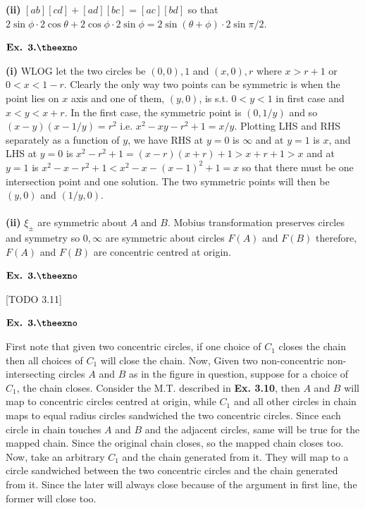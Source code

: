 \documentclass{article}
\def\tf{\textbf}
\newcounter{exno}
\begin{document}
\tf{(ii)} $[ab][cd] + [ad][bc] = [ac][bd]$ so that $2\sin\phi\cdot 2\cos\theta + 2\cos\phi\cdot 2\sin\phi = 2\sin(\theta+\phi)\cdot 2\sin\pi/2$.

\vspace{0.2in}

${\textbf{Ex. 3.\theexno}}$
\addtocounter{exno}{1}

\tf{(i)} WLOG let the two circles be $(0,0),1$ and $(x,0),r$ where $x>r+1$ or $0 < x < 1-r$. Clearly the only way two points can be symmetric is when the point lies on $x$ axis and one of them, $(y,0)$, is s.t. $0 < y < 1$ in first case and $x < y < x+r$. In the first case, the symmetric point is $(0,1/y)$ and so $(x-y)(x-1/y) = r^2$ i.e. $x^2-xy-r^2+1 = x/y$. Plotting LHS and RHS separately as a function of $y$, we have RHS at $y=0$ is $\infty$ and at $y=1$ is $x$, and LHS at $y=0$ is $x^2-r^2+1 = (x-r)(x+r)+1 > x+r+1 > x$ and at $y=1$ is $x^2-x-r^2+1 < x^2-x-(x-1)^2+1 = x$ so that there must be one intersection point and one solution. The two symmetric points will then be $(y,0)$ and $(1/y,0)$.\\~\\

\tf{(ii)} $\xi_{\pm}$ are symmetric about $A$ and $B$. Mobius transformation preserves circles and symmetry so $0,\infty$ are symmetric about circles $F(A)$ and $F(B)$ therefore, $F(A)$ and $F(B)$ are concentric centred at origin.

\vspace{0.2in}

${\textbf{Ex. 3.\theexno}}$
\addtocounter{exno}{1}

[TODO 3.11]

\vspace{0.2in}

${\textbf{Ex. 3.\theexno}}$
\addtocounter{exno}{1}

First note that given two concentric circles, if one choice of $C_1$ closes the chain then all choices of $C_1$ will close the chain. Now, Given two non-concentric non-intersecting circles $A$ and $B$ as in the figure in question, suppose for a choice of $C_1$, the chain closes. Consider the M.T. described in \tf{Ex. 3.10}, then $A$ and $B$ will map to concentric circles centred at origin, while $C_1$ and all other circles in chain maps to equal radius circles sandwiched the two concentric circles. Since each circle in chain touches $A$ and $B$ and the adjacent circles, same will be true for the mapped chain. Since the original chain closes, so the mapped chain closes too. Now, take an arbitrary $C_1$ and the chain generated from it. They will map to a circle sandwiched between the two concentric circles and the chain generated from it. Since the later will always close because of the argument in first line, the former will close too.
\end{document}

